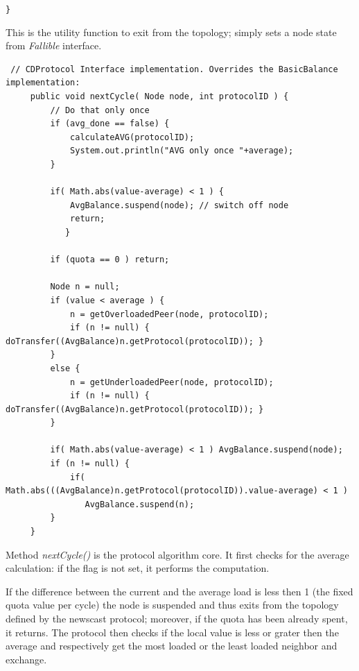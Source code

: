 \documentclass[a4paper,12pt]{article}
\begin{document}
\texttt{\footnotesize \}}{\footnotesize \par}

This is the utility function to exit from the topology; simply sets
a node state from \emph{Fallible} interface.\\

\footnotesize
\begin{verbatim}
 // CDProtocol Interface implementation. Overrides the BasicBalance implementation:
     public void nextCycle( Node node, int protocolID ) {
         // Do that only once
         if (avg_done == false) {
             calculateAVG(protocolID);
             System.out.println("AVG only once "+average);
         }
    
         if( Math.abs(value-average) < 1 ) {
             AvgBalance.suspend(node); // switch off node
             return;
            }
     
         if (quota == 0 ) return;
     
         Node n = null;
         if (value < average ) {
             n = getOverloadedPeer(node, protocolID);
             if (n != null) { doTransfer((AvgBalance)n.getProtocol(protocolID)); } 
         }
         else {
             n = getUnderloadedPeer(node, protocolID);
             if (n != null) { doTransfer((AvgBalance)n.getProtocol(protocolID)); } 
         } 
     
         if( Math.abs(value-average) < 1 ) AvgBalance.suspend(node);
         if (n != null) {
             if( Math.abs(((AvgBalance)n.getProtocol(protocolID)).value-average) < 1 ) 
	            AvgBalance.suspend(n);
         }
     }
\end{verbatim}
\normalsize

Method \emph{nextCycle()} is the protocol algorithm core. It first
checks for the average calculation: if the flag is not set, it performs
the computation.

If the difference between the current and the average load is less
then 1 (the fixed quota value per cycle) the node is suspended and
thus exits from the topology defined by the newscast protocol; moreover,
if the quota has been already spent, it returns. The protocol then
checks if the local value is less or grater then the average and respectively
get the most loaded or the least loaded neighbor and exchange.\\
\end{document}
